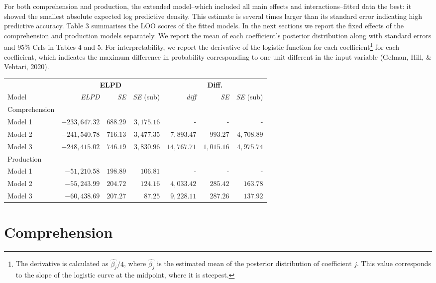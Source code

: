 \documentclass[
  english,
  man,man,floatsintext]{apa6}
\begin{document}
For both comprehension and production, the extended model--which included all main effects and interactions--fitted data the best: it showed the smallest absolute expected log predictive density. This estimate is several times larger than its standard error indicating high predictive accuracy. Table 3 summarises the LOO scores of the fitted models. In the next sections we report the fixed effects of the comprehension and production models separately. We report the mean of each coefficient's posterior distribution along with standard errors and 95\% CrIs in Tables 4 and 5. For interpretability, we report the derivative of the logistic function for each coefficient\footnote{The derivative is calculated as \(\hat{\beta_j}/4\), where \(\hat{\beta_j}\) is the estimated mean of the posterior distribution of coefficient \(j\). This value corresponds to the slope of the logistic curve at the midpoint, where it is steepest.} for each coefficient, which indicates the maximum difference in probability corresponding to one unit different in the input variable (Gelman, Hill, \& Vehtari, 2020).

\captionsetup[table]{labelformat=empty,skip=1pt}
\begin{longtable}{lrrrrrr}
\toprule
& \multicolumn{3}{c}{\textbf{ELPD}} & \multicolumn{3}{c}{\textbf{Diff.}} \\ 
 \cmidrule(lr){2-4}\cmidrule(lr){5-7}
Model & \emph{ELPD} & \emph{SE} & \emph{SE} (sub) & \emph{diff} & \emph{SE} & \emph{SE} (sub) \\ 
\midrule
\multicolumn{1}{l}{Comprehension} \\ 
\midrule
Model 1 & $-233,647.32$ & $688.29$ & $3,175.16$ & - & - & - \\ 
Model 2 & $-241,540.78$ & $716.13$ & $3,477.35$ & $7,893.47$ & $993.27$ & $4,708.89$ \\ 
Model 3 & $-248,415.02$ & $746.19$ & $3,830.96$ & $14,767.71$ & $1,015.16$ & $4,975.74$ \\ 
\midrule
\multicolumn{1}{l}{Production} \\ 
\midrule
Model 1 & $-51,210.58$ & $198.89$ & $106.81$ & - & - & - \\ 
Model 2 & $-55,243.99$ & $204.72$ & $124.16$ & $4,033.42$ & $285.42$ & $163.78$ \\ 
Model 3 & $-60,438.69$ & $207.27$ & $87.25$ & $9,228.11$ & $287.26$ & $137.92$ \\ 
\bottomrule
\end{longtable}

\hypertarget{comprehension}{%
\section{Comprehension}\label{comprehension}}
\end{document}
